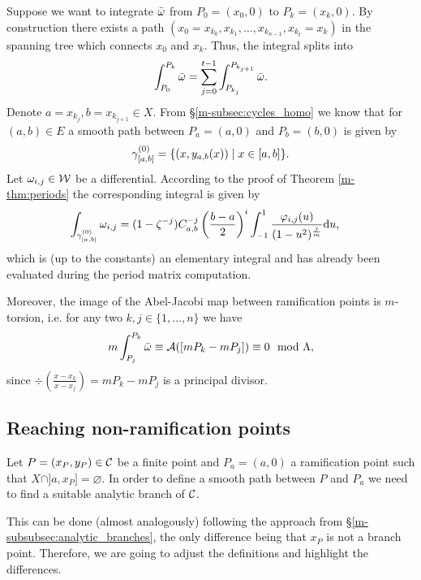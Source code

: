 \documentclass[main.tex]{subfiles}
\begin{document}
  Suppose we want to integrate $\bar{\omega}$ from $P_0 =(x_0,0)$ to $P_k = (x_k,0)$. By construction there exists a path
 $(x_0=x_{k_0},x_{k_1},\dots,x_{k_{n-1}},x_{k_t}=x_k)$ in the spanning tree which connects $x_0$ and $x_k$. Thus, the integral splits into
  \begin{align}
    \int_{P_0}^{P_k} \bar{\omega} = \sum_{j = 0}^{t-1}  \int_{P_{k_j}}^{P_{k_{j+1}}} \bar{\omega}.
  \end{align}
  Denote $a = x_{k_j}, b = x_{k_{j+1}} \in X$. From \S \ref{m-subsec:cycles_homo} we know that for $(a,b) \in E$ a smooth path between $P_a=(a,0)$ and $P_b=(b,0)$ is given by
  \begin{align*}
   \gamma_{[a,b]}^{(0)} = \{  (x,y_{a,b}(x))  \mid  x \in [a,b]  \}.
  \end{align*}
  Let $\omega_{i,j} \in \mathcal{W}$ be a differential. According to the proof of Theorem \ref{m-thm:periods} the corresponding integral is given by
  \begin{align}
   \int_{\gamma_{[a,b]}^{(0)}} \omega_{i,j}  & = 
   (1-\zeta^{-j}) C_{a,b}^{-j} \left(\frac{b-a}{2}\right)^i \int_{-1}^1 \frac{\varphi_{i,j}(u)}{(1-u^2)^{\frac{j}{m}}}  \mathrm d u,
  \end{align}
  which is  (up to the constants) an elementary integral and has already been evaluated during the period matrix computation.
  
  Moreover, the image of the Abel-Jacobi map between ramification points is $m$-torsion, i.e. for any two $k,j \in \{1,\dots,n\}$ we have
  \begin{equation}\label{eq:m_tors}
    m \int_{P_j}^{P_k} \bar{\omega} \equiv \mathcal{A}( [ mP_k - mP_j ] ) \equiv 0 \mod  \Lambda,
  \end{equation}
  since $\div\left( \frac{x-x_k}{x-x_j} \right) = mP_k - mP_j$ is a principal divisor.

  \subsection{Reaching non-ramification points}\label{subsec:ajm_finite}

  Let $P = (x_P,y_P) \in \mathcal{C}$ be a finite point and $P_a = (a,0)$ a ramification point such that $X\cap]a,x_P]=\varnothing$. In order to define a smooth path between $P$ and $P_a$ 
  we need to find a suitable analytic branch of $\mathcal{C}$. 
  
  This can be done (almost analogously) following  the approach from \S \ref{m-subsubsec:analytic_branches}, the only difference being that
  $x_P$ is not a branch point. Therefore, we are going to adjust the definitions and highlight the differences.
  
\end{document}
